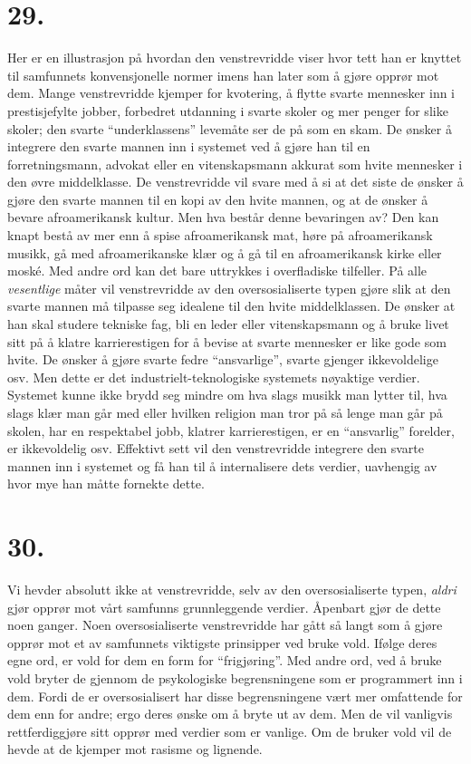 \documentclass[oneside]{book}
\begin{document}
\section*{29.}
Her er en illustrasjon på hvordan den venstrevridde viser hvor tett han er
knyttet til samfunnets konvensjonelle normer imens han later som å gjøre opprør
mot dem. Mange venstrevridde kjemper for kvotering, å flytte svarte mennesker
inn i prestisjefylte jobber, forbedret utdanning i svarte skoler og mer penger
for slike skoler; den svarte ``underklassens'' levemåte ser de på som en skam.
De ønsker å integrere den svarte mannen inn i systemet ved å gjøre han til en
forretningsmann, advokat eller en vitenskapsmann akkurat som hvite mennesker i
den øvre middelklasse. De venstrevridde vil svare med å si at det siste de
ønsker å gjøre den svarte mannen til en kopi av den hvite mannen, og at de
ønsker å bevare afroamerikansk kultur. Men hva består denne bevaringen av? Den
kan knapt bestå av mer enn å spise afroamerikansk mat, høre på afroamerikansk
musikk, gå med afroamerikanske klær og å gå til en afroamerikansk kirke eller
moské. Med andre ord kan det bare uttrykkes i overfladiske tilfeller. På alle
\emph{vesentlige} måter vil venstrevridde av den oversosialiserte typen gjøre
slik at den svarte mannen må tilpasse seg idealene til den hvite middelklassen.
De ønsker at han skal studere tekniske fag, bli en leder eller vitenskapsmann
og å bruke livet sitt på å klatre karrierestigen for å bevise at svarte
mennesker er like gode som hvite. De ønsker å gjøre svarte fedre
``ansvarlige'', svarte gjenger ikkevoldelige osv. Men dette er det
industrielt-teknologiske systemets nøyaktige verdier. Systemet kunne ikke brydd
seg mindre om hva slags musikk man lytter til, hva slags klær man går med eller
hvilken religion man tror på så lenge man går på skolen, har en respektabel
jobb, klatrer karrierestigen, er en ``ansvarlig'' forelder, er ikkevoldelig
osv. Effektivt sett vil den venstrevridde integrere den svarte mannen inn i
systemet og få han til å internalisere dets verdier, uavhengig av hvor mye han
måtte fornekte dette.

\section*{30.}
Vi hevder absolutt ikke at venstrevridde, selv av den oversosialiserte typen,
\emph{aldri} gjør opprør mot vårt samfunns grunnleggende verdier. Åpenbart gjør
de dette noen ganger. Noen oversosialiserte venstrevridde har gått så langt som
å gjøre opprør mot et av samfunnets viktigste prinsipper ved bruke vold. Ifølge
deres egne ord, er vold for dem en form for ``frigjøring''. Med andre ord, ved
å bruke vold bryter de gjennom de psykologiske begrensningene som er
programmert inn i dem. Fordi de er oversosialisert har disse begrensningene
vært mer omfattende for dem enn for andre; ergo deres ønske om å bryte ut av
dem. Men de vil vanligvis rettferdiggjøre sitt opprør med verdier som er
vanlige. Om de bruker vold vil de hevde at de kjemper mot rasisme og lignende.
\end{document}

